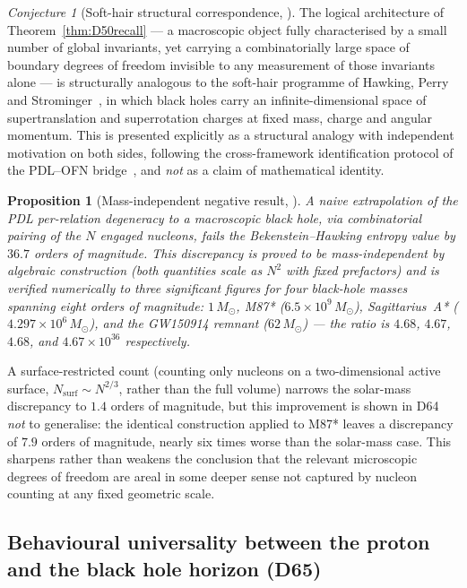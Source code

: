 \documentclass[11pt,a4paper]{article}
\theoremstyle{plain}
\newtheorem{proposition}[theorem]{Proposition}
\theoremstyle{definition}
\theoremstyle{remark}
\newtheorem{conjecture}[theorem]{Conjecture}
\begin{document}
\begin{conjecture}[Soft-hair structural correspondence, \cite{D64}]
\label{conj:softhair}
The logical architecture of Theorem~\ref{thm:D50recall} --- a macroscopic object fully characterised by a small number of global invariants, yet carrying a combinatorially large space of boundary degrees of freedom invisible to any measurement of those invariants alone --- is structurally analogous to the soft-hair programme of Hawking, Perry and Strominger~\cite{HPS2016,HPS2017}, in which black holes carry an infinite-dimensional space of supertranslation and superrotation charges at fixed mass, charge and angular momentum. This is presented explicitly as a structural analogy with independent motivation on both sides, following the cross-framework identification protocol of the PDL--OFN bridge~\cite{N01,N02}, and \emph{not} as a claim of mathematical identity.
\end{conjecture}

\begin{proposition}[Mass-independent negative result, \cite{D64}]
\label{prop:D64negative}
A naive extrapolation of the PDL per-relation degeneracy to a macroscopic black hole, via combinatorial pairing of the $N$ engaged nucleons, fails the Bekenstein--Hawking entropy value by $36.7$ orders of magnitude. This discrepancy is proved to be mass-independent by algebraic construction (both quantities scale as $N^2$ with fixed prefactors) and is verified numerically to three significant figures for four black-hole masses spanning eight orders of magnitude: $1\,M_\odot$, M87* ($6.5\times10^9\,M_\odot$), Sagittarius~A* ($4.297\times10^6\,M_\odot$), and the GW150914 remnant ($62\,M_\odot$) --- the ratio is $4.68$, $4.67$, $4.68$, and $4.67\times10^{36}$ respectively.
\end{proposition}

A surface-restricted count (counting only nucleons on a two-dimensional active surface, $N_{\mathrm{surf}}\sim N^{2/3}$, rather than the full volume) narrows the solar-mass discrepancy to $1.4$ orders of magnitude, but this improvement is shown in D64 \emph{not} to generalise: the identical construction applied to M87* leaves a discrepancy of $7.9$ orders of magnitude, nearly six times worse than the solar-mass case. This sharpens rather than weakens the conclusion that the relevant microscopic degrees of freedom are areal in some deeper sense not captured by nucleon counting at any fixed geometric scale.

\subsection{Behavioural universality between the proton and the black hole horizon (D65)}
\label{subsec:D65}
\end{document}
